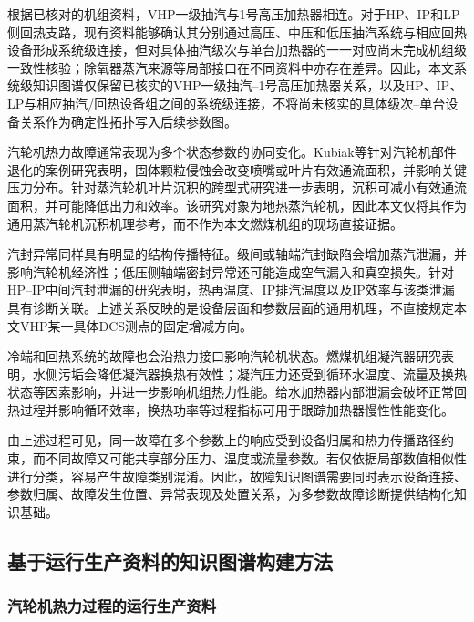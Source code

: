根据已核对的机组资料，VHP一级抽汽与1号高压加热器相连。对于HP、IP和LP侧回热支路，现有资料能够确认其分别通过高压、中压和低压抽汽系统与相应回热设备形成系统级连接，但对具体抽汽级次与单台加热器的一一对应尚未完成机组级一致性核验；除氧器蒸汽来源等局部接口在不同资料中亦存在差异。因此，本文系统级知识图谱仅保留已核实的VHP一级抽汽--1号高压加热器关系，以及HP、IP、LP与相应抽汽/回热设备组之间的系统级连接，不将尚未核实的具体级次--单台设备关系作为确定性拓扑写入后续参数图。

汽轮机热力故障通常表现为多个状态参数的协同变化。Kubiak等针对汽轮机部件退化的案例研究表明，固体颗粒侵蚀会改变喷嘴或叶片有效通流面积，并影响关键压力分布\cite{Kubiak2002TurbineDegradation}。针对蒸汽轮机叶片沉积的跨型式研究进一步表明，沉积可减小有效通流面积，并可能降低出力和效率\cite{Kubiak2002ScaleDeposit}。该研究对象为地热蒸汽轮机，因此本文仅将其作为通用蒸汽轮机沉积机理参考，而不作为本文燃煤机组的现场直接证据。

汽封异常同样具有明显的结构传播特征。级间或轴端汽封缺陷会增加蒸汽泄漏，并影响汽轮机经济性；低压侧轴端密封异常还可能造成空气漏入和真空损失\cite{ZhangHu2021FaultPropagationGNN}。针对HP--IP中间汽封泄漏的研究表明，热再温度、IP排汽温度以及IP效率与该类泄漏具有诊断关联\cite{Xu2011HPIPLeakage}。上述关系反映的是设备层面和参数层面的通用机理，不直接规定本文VHP某一具体DCS测点的固定增减方向。

冷端和回热系统的故障也会沿热力接口影响汽轮机状态。燃煤机组凝汽器研究表明，水侧污垢会降低凝汽器换热有效性；凝汽压力还受到循环水温度、流量及换热状态等因素影响，并进一步影响机组热力性能\cite{Li2016CondenserFouling,Medica2018CondenserCondition}。给水加热器内部泄漏会破坏正常回热过程并影响循环效率，换热功率等过程指标可用于跟踪加热器慢性性能变化\cite{Heo2012FWHLeakage,Barszcz2011FeedwaterHeater}。

由上述过程可见，同一故障在多个参数上的响应受到设备归属和热力传播路径约束，而不同故障又可能共享部分压力、温度或流量参数。若仅依据局部数值相似性进行分类，容易产生故障类别混淆。因此，故障知识图谱需要同时表示设备连接、参数归属、故障发生位置、异常表现及处置关系，为多参数故障诊断提供结构化知识基础。

\subsection{基于运行生产资料的知识图谱构建方法}
\label{subsec:kg_construction_v8}

\subsubsection{汽轮机热力过程的运行生产资料}
\label{subsubsec:operation_materials_v8}

